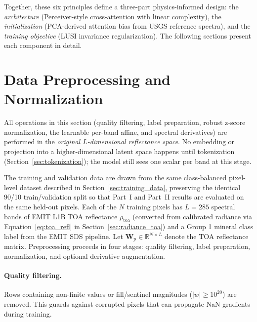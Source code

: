 \documentclass[11pt]{report}
\newcommand{\R}{\mathbb{R}}
\begin{document}
Together, these six principles define a three-part physics-informed design: the \emph{architecture} (Perceiver-style cross-attention with linear complexity), the \emph{initialization} (PCA-derived attention bias from USGS reference spectra), and the \emph{training objective} (LUSI invariance regularization). The following sections present each component in detail.

\section{Data Preprocessing and Normalization}
\label{sec:preprocessing}

All operations in this section (quality filtering, label preparation, robust z-score normalization, the learnable per-band affine, and spectral derivatives) are performed in the \emph{original $L$-dimensional reflectance space}. No embedding or projection into a higher-dimensional latent space happens until tokenization (Section~\ref{sec:tokenization}); the model still sees one scalar per band at this stage.

The training and validation data are drawn from the same class-balanced pixel-level dataset described in Section~\ref{sec:training_data}, preserving the identical 90/10 train/validation split so that Part~I and Part~II results are evaluated on the same held-out pixels. 
Each of the $N$ training pixels has $L = 285$ spectral bands of EMIT L1B TOA reflectance $\rho_{\text{toa}}$ (converted from calibrated radiance via Equation~\ref{eq:toa_refl} in Section~\ref{sec:radiance_toa}) and a Group 1 mineral class label from the EMIT SDS pipeline.
Let $\mathbf{W}_p \in \R^{N \times L}$ denote the TOA reflectance matrix. Preprocessing proceeds in four stages: quality filtering, label preparation, normalization, and optional derivative augmentation.

\paragraph{Quality filtering.}
Rows containing non-finite values or fill/sentinel magnitudes ($|w| \geq 10^{20}$) are removed. 
This guards against corrupted pixels that can propagate NaN gradients during training.
\end{document}
